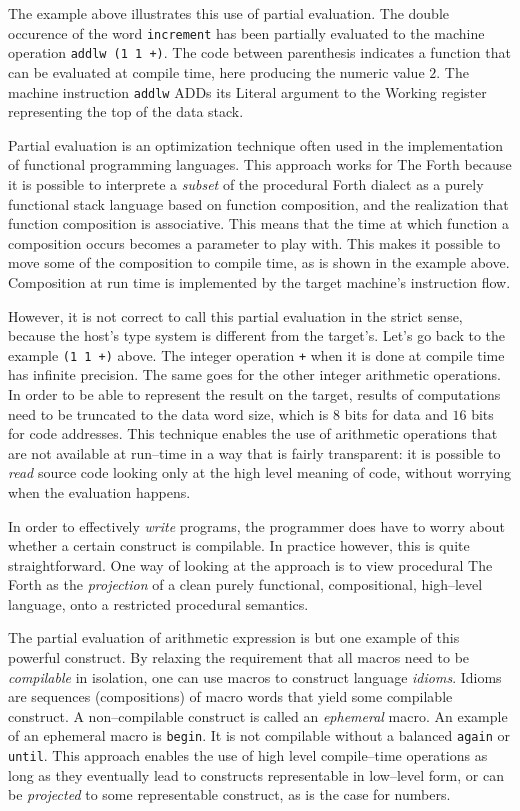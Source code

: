 \documentclass[12pt]{article}
\begin{document}
The example above illustrates this use of partial evaluation.  The
double occurence of the word \verb"increment" has been partially
evaluated to the machine operation \verb"addlw (1 1 +)". The code
between parenthesis indicates a function that can be evaluated at
compile time, here producing the numeric value $2$. The machine
instruction \verb"addlw" ADDs its Literal argument to the Working
register representing the top of the data stack.

Partial evaluation is an optimization technique often used in the
implementation of functional programming languages. This approach
works for The Forth because it is possible to interprete a
\emph{subset} of the procedural Forth dialect as a purely functional
stack language based on function composition, and the realization that
function composition is associative. This means that the time at which
function a composition occurs becomes a parameter to play with. This
makes it possible to move some of the composition to compile time, as
is shown in the example above. Composition at run time is implemented
by the target machine's instruction flow.

However, it is not correct to call this partial evaluation in the
strict sense, because the host's type system is different from the
target's. Let's go back to the example \verb"(1 1 +)" above. The
integer operation \verb"+" when it is done at compile time has
infinite precision. The same goes for the other integer arithmetic
operations. In order to be able to represent the result on the target,
results of computations need to be truncated to the data word size,
which is $8$ bits for data and $16$ bits for code addresses. This
technique enables the use of arithmetic operations that are not
available at run--time in a way that is fairly transparent: it is
possible to \emph{read} source code looking only at the high level
meaning of code, without worrying when the evaluation happens.

In order to effectively \emph{write} programs, the programmer does
have to worry about whether a certain construct is compilable. In
practice however, this is quite straightforward.  One way of looking
at the approach is to view procedural The Forth as the \emph{projection}
of a clean purely functional, compositional, high--level language,
onto a restricted procedural semantics.

The partial evaluation of arithmetic expression is but one example of
this powerful construct.  By relaxing the requirement that all macros
need to be \emph{compilable} in isolation, one can use macros to
construct language \emph{idioms}.  Idioms are sequences (compositions)
of macro words that yield some compilable construct. A non--compilable
construct is called an \emph{ephemeral} macro. An example of an
ephemeral macro is \verb"begin". It is not compilable without a
balanced \verb"again" or \verb"until".  This approach enables the use
of high level compile--time operations as long as they eventually
lead to constructs representable in low--level form, or can be
\emph{projected} to some representable construct, as is the case for
numbers.
\end{document}
